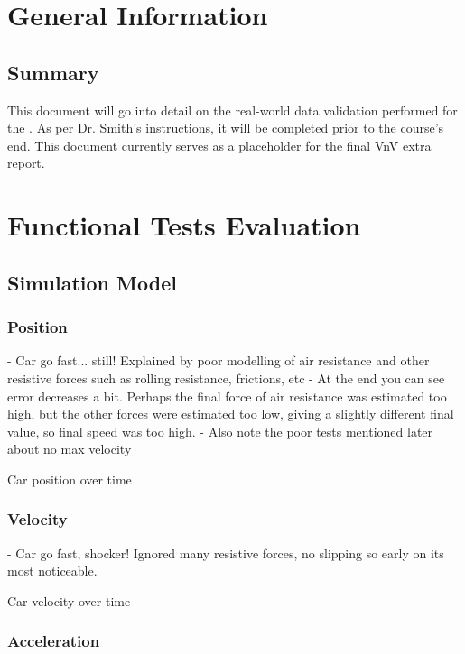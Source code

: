 \documentclass[12pt, titlepage]{article}
\begin{document}

\section{General Information}

\subsection{Summary}

\noindent This document will go into detail on the real-world data validation performed for the \progname{}. As per Dr. Smith's instructions, it will be completed prior to the course's end. This document currently serves as a placeholder for the final VnV extra report.

\section{Functional Tests Evaluation}

\subsection{Simulation Model}

\subsubsection{Position}

- Car go fast... still! Explained by poor modelling of air resistance and other resistive forces such as rolling resistance, frictions, etc
- At the end you can see error decreases a bit. Perhaps the final force of air resistance was estimated too high, but the other forces were estimated too low, giving a slightly different final value, so final speed was too high.
- Also note the poor tests mentioned later about no max velocity

Car position over time

\subsubsection{Velocity}

- Car go fast, shocker! Ignored many resistive forces, no slipping so early on its most noticeable.

Car velocity over time

\subsubsection{Acceleration}
\end{document}
